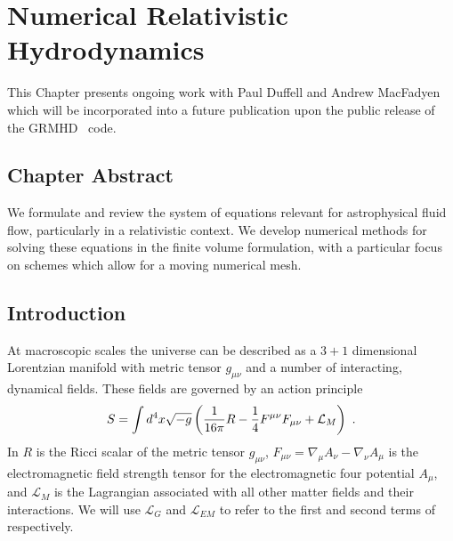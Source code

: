 \renewcommand{\chapid}{numerics}


\newcommand{\LL}{\mathcal{L}}
\newcommand{\UU}{\mathcal{U}}
\newcommand{\FF}{\mathcal{F}}
\renewcommand{\SS}{\mathcal{S}}
\newcommand{\dual}[1]{*\!\! #1}
\newcommand{\dualt}[1]{*\! #1}


\chapter{Numerical Relativistic Hydrodynamics}

This Chapter presents ongoing work with Paul Duffell and Andrew MacFadyen which will be incorporated into a future publication upon the public release of the GRMHD \Disco\ code.


\section{Chapter Abstract}

We formulate and review the system of equations relevant for astrophysical fluid flow, particularly in a relativistic context.  We develop numerical methods for solving these equations in the finite volume formulation, with a particular focus on schemes which allow for a moving numerical mesh.  


\section{Introduction} 

At macroscopic scales the universe can be described as a $3+1$ dimensional Lorentzian manifold with metric tensor $g_{\mu\nu}$ and a number of interacting, dynamical fields.  These fields are governed by an action principle
\begin{equation}
	S = \int d^4x \sqrt{-g} \left( \frac{1}{16\pi} R - \frac{1}{4}F^{\mu\nu}F_{\mu\nu}  + \LL_M\right)\ . \eqlabel{action}
\end{equation}
In  $R$ is the Ricci scalar of the metric tensor $g_{\mu\nu}$, $F_{\mu\nu} = \nabla_\mu A_\nu - \nabla_\nu A_\mu$ is the electromagnetic field strength tensor for the electromagnetic four potential $A_\mu$, and $\LL_M$ is the Lagrangian associated with all other matter fields and their interactions.  We will use $\LL_G$ and $\LL_{EM}$ to refer to the first and second terms of  respectively.

